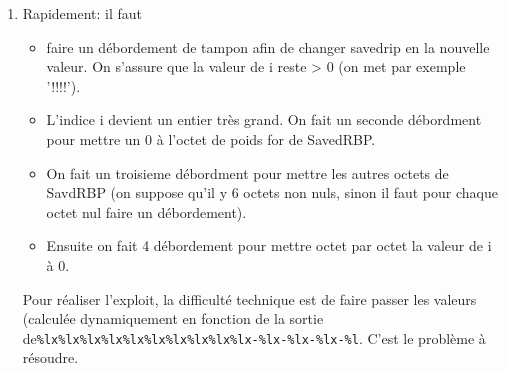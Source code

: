 \documentclass[a4paper,9pt]{article}
\theoremstyle{plain}
\theoremstyle{definition}
\begin{document}
\begin{correction}
\begin{enumerate}
\begin{verbatim}
main = 55aa2ec5d33e
askquestions = 55aa2ec5d229
\end{verbatim}
\item Rapidement: il faut
\begin{itemize}
\item faire un débordement de tampon afin de changer savedrip en la nouvelle valeur. On s'assure que la valeur de i reste > 0 (on met par exemple '!!!!').
\item L'indice i devient un entier très grand. On fait un seconde débordment pour mettre un 0 à l'octet de poids for de SavedRBP.
\item  On fait un troisieme débordment pour mettre les autres octets de SavdRBP (on suppose qu'il y 6 octets non nuls, sinon il faut pour chaque octet nul faire un débordement).
\item Ensuite on fait 4 débordement pour mettre octet par octet la valeur de i à 0.
\end{itemize}

Pour réaliser l'exploit, la difficulté technique est de faire passer les valeurs (calculée dynamiquement en fonction de la sortie de\verb|%lx%lx%lx%lx%lx%lx%lx%lx%lx%lx-%lx-%lx-%lx-%l|. C'est le problème à résoudre. 
\end{enumerate}
\end{correction}
\end{document}
